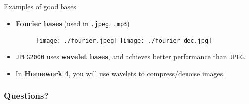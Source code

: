 \documentclass{beamer}
\begin{document}
\begin{frame}[t]{Examples of good bases}
	\begin{itemize}
		\item \textbf{Fourier bases} (used in \texttt{.jpeg}, \texttt{.mp3})
			\begin{figure}
				\texttt{[image: ./fourier.jpeg]}
				\hspace{1cm}
				\texttt{[image: ./fourier\_dec.jpg]}
			\end{figure}

		\item \texttt{JPEG2000} uses \textbf{wavelet bases}, and achieves better performance than \texttt{JPEG}.
		\item In \textbf{Homework 4}, you will use wavelets to compress/denoise images.
	\end{itemize}
\end{frame}
\appendix
\backupbegin
\begin{frame}
	\frametitle{Questions?}
\end{frame}
\backupend
\end{document}
